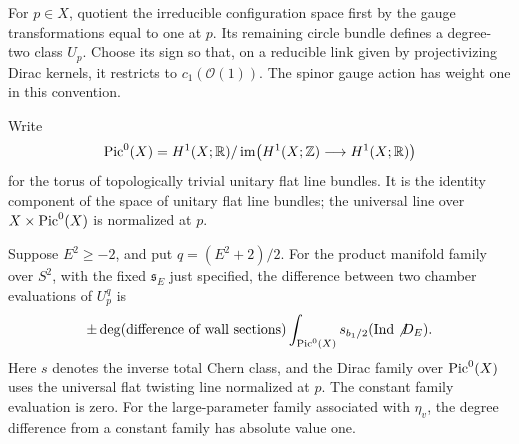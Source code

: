 For \(p\in X\), quotient the irreducible configuration space first
by the gauge transformations equal to one at \(p\).  Its remaining
circle bundle defines a degree-two class \(U_p\).  Choose its sign
so that, on a reducible link given by projectivizing Dirac kernels,
it restricts to \(c_1(\mathcal O(1))\).
The spinor gauge action has weight one in this convention.

Write
\[
 \operatorname{Pic}^0(X)=H^1(X;\mathbb R)/\operatorname{im}\bigl(H^1(X;\mathbb Z)
                                      \longrightarrow H^1(X;\mathbb R)\bigr)
\]
for the torus of topologically trivial unitary flat line bundles.
It is the identity component of the space of unitary flat line bundles;
the universal line over \(X\times\operatorname{Pic}^0(X)\) is normalized at \(p\).

\begin{lemma}
 \label{lem:families-wall-crossing}
 Suppose \(E^2\ge-2\), and put \(q=(E^2+2)/2\).
 For the product manifold family over \(S^2\), with the fixed
 \(\mathfrak s_E\) just specified, the difference between two
 chamber evaluations of \(U_p^q\) is
 \begin{equation}
  \label{eq:families-wall-formula}
  \pm\deg(\text{difference of wall sections})
       \int_{\operatorname{Pic}^0(X)}
          s_{b_1/2}(\operatorname{Ind}\not D_E).
 \end{equation}
 Here \(s\) denotes the inverse total Chern class, and the Dirac
 family over \(\operatorname{Pic}^0(X)\) uses the universal flat twisting line
 normalized at \(p\).  The constant family evaluation is zero.
 For the large-parameter family
  associated with \(\eta_v\),
 the degree difference from a constant family has absolute value
 one.
\end{lemma}

